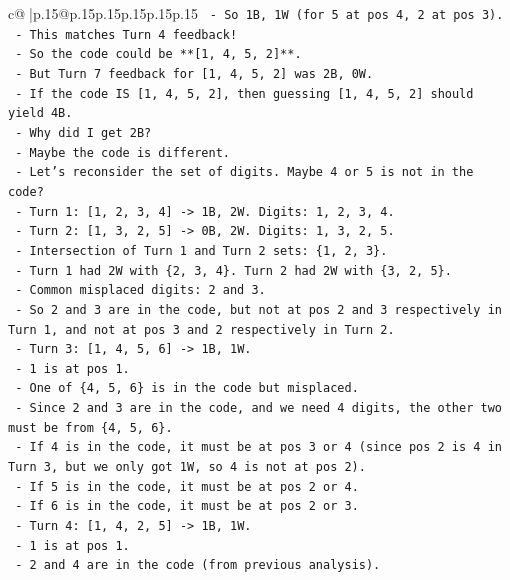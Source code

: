 \documentclass{article}
\begin{document}
{\begin{supertabular}{c@{$\;$}|p{.15\linewidth}@{}p{.15\linewidth}p{.15\linewidth}p{.15\linewidth}p{.15\linewidth}p{.15\linewidth}}
{{{\texttt{  {-} So 1B, 1W (for 5 at pos 4, 2 at pos 3).} \\
\texttt{  {-} This matches Turn 4 feedback!} \\
\texttt{  {-} So the code could be **{[}1, 4, 5, 2{]}**.} \\
\texttt{  {-} But Turn 7 feedback for {[}1, 4, 5, 2{]} was 2B, 0W.} \\
\texttt{  {-} If the code IS {[}1, 4, 5, 2{]}, then guessing {[}1, 4, 5, 2{]} should yield 4B.} \\
\texttt{  {-} Why did I get 2B?} \\
\texttt{  {-} Maybe the code is different.} \\
\texttt{  {-} Let's reconsider the set of digits. Maybe 4 or 5 is not in the code?} \\
\texttt{  {-} Turn 1: {[}1, 2, 3, 4{]} {-}> 1B, 2W. Digits: 1, 2, 3, 4.} \\
\texttt{  {-} Turn 2: {[}1, 3, 2, 5{]} {-}> 0B, 2W. Digits: 1, 3, 2, 5.} \\
\texttt{  {-} Intersection of Turn 1 and Turn 2 sets: \{1, 2, 3\}.} \\
\texttt{  {-} Turn 1 had 2W with \{2, 3, 4\}. Turn 2 had 2W with \{3, 2, 5\}.} \\
\texttt{  {-} Common misplaced digits: 2 and 3.} \\
\texttt{  {-} So 2 and 3 are in the code, but not at pos 2 and 3 respectively in Turn 1, and not at pos 3 and 2 respectively in Turn 2.} \\
\texttt{  {-} Turn 3: {[}1, 4, 5, 6{]} {-}> 1B, 1W.} \\
\texttt{    {-} 1 is at pos 1.} \\
\texttt{    {-} One of \{4, 5, 6\} is in the code but misplaced.} \\
\texttt{    {-} Since 2 and 3 are in the code, and we need 4 digits, the other two must be from \{4, 5, 6\}.} \\
\texttt{    {-} If 4 is in the code, it must be at pos 3 or 4 (since pos 2 is 4 in Turn 3, but we only got 1W, so 4 is not at pos 2).} \\
\texttt{    {-} If 5 is in the code, it must be at pos 2 or 4.} \\
\texttt{    {-} If 6 is in the code, it must be at pos 2 or 3.} \\
\texttt{  {-} Turn 4: {[}1, 4, 2, 5{]} {-}> 1B, 1W.} \\
\texttt{    {-} 1 is at pos 1.} \\
\texttt{    {-} 2 and 4 are in the code (from previous analysis).} \\
}}}
\end{supertabular}}
\end{document}
